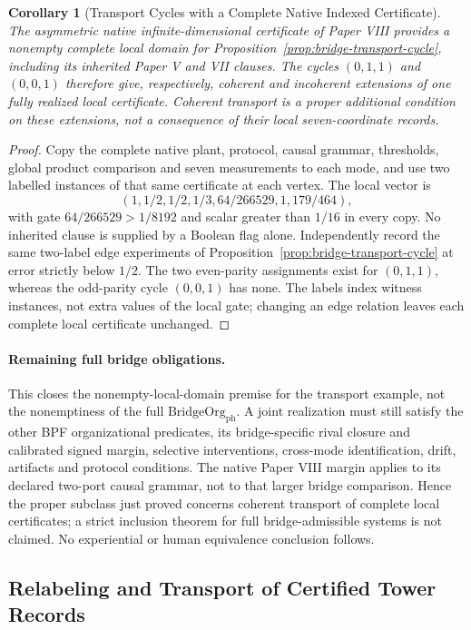 \documentclass[11pt,a4paper]{article}
\newtheorem{corollary}[theorem]{Corollary}
\theoremstyle{definition}
\newcommand{\BridgeClass}{\mathrm{BridgeOrg}_{\mathrm{ph}}}
\begin{document}
\begin{corollary}[Transport Cycles with a Complete Native Indexed Certificate]
\label{cor:native-transport-record}
The asymmetric native infinite-dimensional certificate of Paper VIII provides
a nonempty complete local domain for Proposition~\ref{prop:bridge-transport-cycle},
including its inherited Paper V and VII clauses. The cycles $(0,1,1)$ and
$(0,0,1)$ therefore give, respectively, coherent and incoherent extensions
of one fully realized local certificate. Coherent transport is a proper
additional condition on these extensions, not a consequence of their local
seven-coordinate records.
\end{corollary}
\begin{proof}
Copy the complete native plant, protocol, causal grammar, thresholds, global
product comparison and seven measurements to each mode, and use two labelled
instances of that same certificate at each vertex. The local vector is
\[
 (1,1/2,1/2,1/3,64/266529,1,179/464),
\]
with gate $64/266529>1/8192$ and scalar greater than $1/16$ in every copy.
No inherited clause is supplied by a Boolean flag alone. Independently record
the same two-label edge experiments of Proposition~\ref{prop:bridge-transport-cycle}
at error strictly below $1/2$. The two even-parity assignments exist for
$(0,1,1)$, whereas the odd-parity cycle $(0,0,1)$ has none. The labels index
witness instances, not extra values of the local gate; changing an edge
relation leaves each complete local certificate unchanged.
\end{proof}

\paragraph{Remaining full bridge obligations.}
This closes the nonempty-local-domain premise for the transport example,
not the nonemptiness of the full $\BridgeClass$. A joint realization must
still satisfy the other BPF organizational predicates, its bridge-specific
rival closure and calibrated signed margin, selective interventions, cross-mode
identification, drift, artifacts and protocol conditions. The native
Paper VIII margin applies to its declared two-port causal grammar, not to
that larger bridge comparison. Hence the proper subclass just proved concerns
coherent transport of complete local certificates; a strict inclusion theorem
for full bridge-admissible systems is not claimed. No experiential or human
equivalence conclusion follows.

\subsection{Relabeling and Transport of Certified Tower Records}
\end{document}
